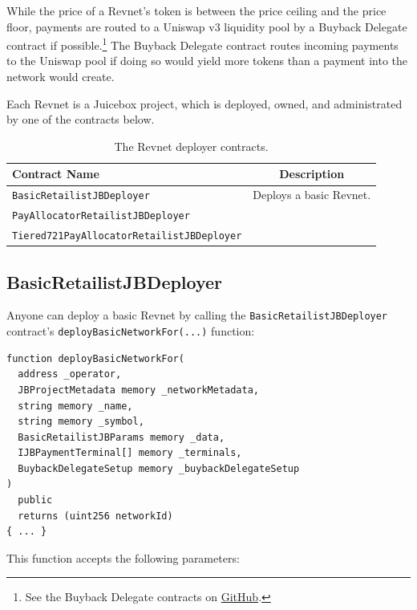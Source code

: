 \documentclass{article}
\begin{document}
While the price of a Revnet's token is between the price ceiling and the price floor, payments are routed to a Uniswap v3 liquidity pool by a Buyback Delegate contract if possible.\footnote{See the Buyback Delegate contracts on \href{https://github.com/jbx-protocol/juice-buyback}{GitHub}.} The Buyback Delegate contract routes incoming payments to the Uniswap pool if doing so would yield more tokens than a payment into the network would create.

Each Revnet is a Juicebox project, which is deployed, owned, and administrated by one of the contracts below.

\begin{table}[h]
  \centering
  \begin{tabular}{|l|c|}
    \hline
    Contract Name & Description \\
    \hline
    \texttt{BasicRetailistJBDeployer} & Deploys a basic Revnet. \\
    \hline
    \texttt{PayAllocatorRetailistJBDeployer} & \\
    \hline
    \texttt{Tiered721PayAllocatorRetailistJBDeployer} & \\
    \hline
  \end{tabular}
  \caption{The Revnet deployer contracts.}
\end{table}

\subsection{BasicRetailistJBDeployer}

Anyone can deploy a basic Revnet by calling the \texttt{BasicRetailistJBDeployer} contract's \texttt{deployBasicNetworkFor(...)} function:

\begin{lstlisting}[language=Solidity]
function deployBasicNetworkFor(
  address _operator,
  JBProjectMetadata memory _networkMetadata,
  string memory _name,
  string memory _symbol,
  BasicRetailistJBParams memory _data,
  IJBPaymentTerminal[] memory _terminals,
  BuybackDelegateSetup memory _buybackDelegateSetup
)
  public
  returns (uint256 networkId)
{ ... }
\end{lstlisting}

This function accepts the following parameters:
\end{document}
